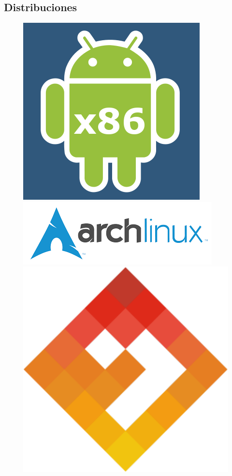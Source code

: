 \subsection{Distribuciones}

\begin{figure}[ht!]
	\centering
	
	\includegraphics[width=0.2\paperwidth]{./img/linux/android}
	\includegraphics[width=0.2\paperwidth]{./img/linux/archlinux}
	\includegraphics[width=0.2\paperwidth]{./img/linux/asteroidos}

\end{figure}
